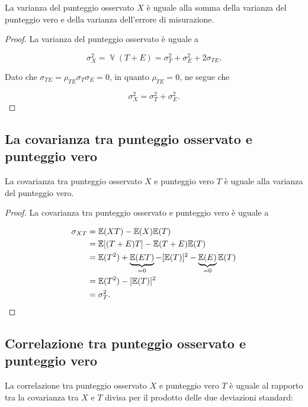 \documentclass[
  11pt,
]{krantz}
\DeclareMathOperator{\V}{\mathbb{V}} %
\newcommand{\E}{\mathbb{E}} %
\theoremstyle{definition}
\theoremstyle{definition}
\theoremstyle{definition}
\theoremstyle{definition}
\theoremstyle{remark}
\begin{document}
La varianza del punteggio osservato \(X\) è uguale alla somma della varianza del punteggio vero e della varianza dell'errore di misurazione.

\begin{proof}
La varianza del punteggio osservato è uguale a

\[
\sigma^2_X =  \V(T+E) =  \sigma_T^2 + \sigma_E^2 + 2 \sigma_{TE}.
\label{eq:3-2-4}
\]

Dato che \(\sigma_{TE}=\rho_{TE}\sigma_T \sigma_E=0\), in quanto \(\rho_{TE}=0\), ne segue che

\[
\sigma^2_X =   \sigma_T^2 + \sigma_E^2.
\label{eq:var-sum}
\]
\end{proof}

\hypertarget{la-covarianza-tra-punteggio-osservato-e-punteggio-vero}{%
\subsection{La covarianza tra punteggio osservato e punteggio vero}\label{la-covarianza-tra-punteggio-osservato-e-punteggio-vero}}

La covarianza tra punteggio osservato \(X\) e punteggio vero \(T\) è uguale alla varianza del punteggio vero.

\begin{proof}
La covarianza tra punteggio osservato e punteggio vero è uguale a

\[
\begin{aligned}
\sigma_{X T} &= \E(XT) - \E(X)\E(T)\notag\\
&=  \E[(T+E)T] - \E(T+E)\E(T)\notag\\
&=  \E(T^2) + \underbrace{\E(ET)}_{=0} - [\E(T)]^2 -  \underbrace{\E(E)}_{=0} \E(T)\notag\\
&=\E(T^2) - [\E(T)]^2\notag \\
&= \sigma_T^2.
\end{aligned}
\]
\end{proof}

\hypertarget{correlazione-tra-punteggio-osservato-e-punteggio-vero}{%
\subsection{Correlazione tra punteggio osservato e punteggio vero}\label{correlazione-tra-punteggio-osservato-e-punteggio-vero}}

La correlazione tra punteggio osservato \(X\) e punteggio vero \(T\) è uguale al rapporto tra la covarianza tra \(X\) e \(T\) divisa per il prodotto delle due deviazioni standard:
\end{document}
